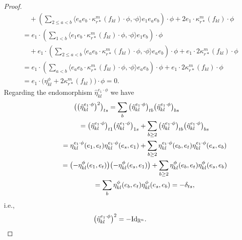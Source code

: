 \documentclass[10pt,a4paper]{amsart}
\numberwithin{equation}{section}
\begin{document}
\begin{proof}
\begin{gather*}
 \qquad{} +\left(\sum_{2\leq a<b} \big\langle e_ae_b\cdot\kappa_{r*}^m(f_{kl})\cdot\phi,\cdot\phi\big\rangle e_1e_ae_b\right)\cdot\phi
 + 2e_1\cdot\kappa_{r*}^m(f_{kl})\cdot\phi\\
 \quad{} = e_1\cdot\left(\sum_{1<b} \big\langle e_1e_b\cdot\kappa_{r*}^m(f_{kl})\cdot\phi,\cdot\phi\big\rangle e_1e_b\right)\cdot\phi\\
 \qquad{} +e_1\cdot\left(\sum_{2\leq a<b} \big\langle e_ae_b\cdot\kappa_{r*}^m(f_{kl})\cdot\phi,\cdot\phi\big\rangle e_ae_b\right)\cdot\phi
 + e_1\cdot 2\kappa_{r*}^m(f_{kl})\cdot\phi\\
 \quad{}= e_1\cdot\left(\sum_{a<b} \big\langle e_ae_b\cdot\kappa_{r*}^m(f_{kl})\cdot\phi,\cdot\phi\big\rangle e_ae_b\right)\cdot\phi
 +e_1\cdot 2\kappa_{r*}^m(f_{kl})\cdot\phi\\
\quad{} = e_1\cdot\big(\eta_{kl}^{\phi} +2\kappa_{r*}^m(f_{kl})\big)\cdot\phi = 0.
\end{gather*}
Regarding the endomorphism $\hat\eta_{kl}^{e_1\cdot\phi}$ we have
\begin{gather*}
\big(\big(\hat\eta_{kl}^{e_1\cdot\phi}\big)^2\big)_{ts} =\sum_{b}\big(\hat\eta_{kl}^{e_1\cdot\phi}\big)_{tb}\big(\hat\eta_{kl}^{e_1\cdot\phi}\big)_{bs}\\
\hphantom{\big(\big(\hat\eta_{kl}^{e_1\cdot\phi}\big)^2\big)_{ts}}{}
=\big(\hat\eta_{kl}^{e_1\cdot\phi}\big)_{t1}\big(\hat\eta_{kl}^{e_1\cdot\phi}\big)_{1s}
 +\sum_{b\geq2}\big(\hat\eta_{kl}^{e_1\cdot\phi}\big)_{tb}\big(\hat\eta_{kl}^{e_1\cdot\phi}\big)_{bs}\\
\hphantom{\big(\big(\hat\eta_{kl}^{e_1\cdot\phi}\big)^2\big)_{ts}}{} =\eta_{kl}^{e_1\cdot\phi}(e_1,e_t)\eta_{kl}^{e_1\cdot\phi}(e_s,e_1)
 +\sum_{b\geq2}\eta_{kl}^{e_1\cdot\phi}(e_b,e_t)\eta_{kl}^{e_1\cdot\phi}(e_s,e_b)\\
\hphantom{\big(\big(\hat\eta_{kl}^{e_1\cdot\phi}\big)^2\big)_{ts}}{} =\big({-}\eta_{kl}^{\phi}(e_1,e_t)\big)\big({-}\eta_{kl}^{\phi}(e_s,e_1)\big)
 +\sum_{b\geq2}\eta_{kl}^{\phi}(e_b,e_t)\eta_{kl}^{\phi}(e_s,e_b)\\
\hphantom{\big(\big(\hat\eta_{kl}^{e_1\cdot\phi}\big)^2\big)_{ts}}{} =\sum_{b}\eta_{kl}^{\phi}(e_b,e_t)\eta_{kl}^{\phi}(e_s,e_b) =-\delta_{ts},
\end{gather*}
i.e.,
\begin{gather*}\big(\hat\eta_{kl}^{e_1\cdot\phi}\big)^2=-{\rm Id}_{\mathbb{R}^n}.\tag*{\qed}\end{gather*}\renewcommand{\qed}{}
\end{proof}
\end{document}
